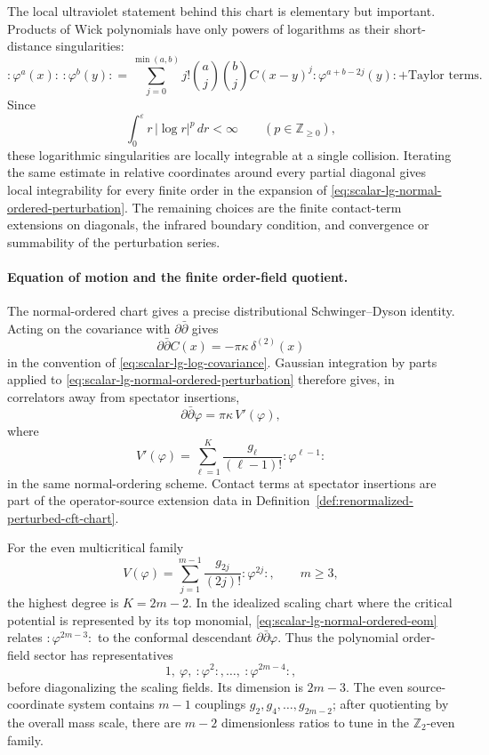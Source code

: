 The local ultraviolet statement behind this chart is elementary but
important.  Products of Wick polynomials have only powers of logarithms as
their short-distance singularities:
\[
  :\!\varphi^a(x)\!:\,:\!\varphi^b(y)\!:
  =
  \sum_{j=0}^{\min(a,b)}
  j!\binom{a}{j}\binom{b}{j}C(x-y)^j
  :\!\varphi^{a+b-2j}(y)\!:
  +\text{Taylor terms}.
\]
Since
\[
  \int_0^\varepsilon r\,|\log r|^p\,dr<\infty
  \qquad (p\in\mathbb Z_{\geq0}),
\]
these logarithmic singularities are locally integrable at a single collision.
Iterating the same estimate in relative coordinates around every partial
diagonal gives local integrability for every finite order in the expansion of
\eqref{eq:scalar-lg-normal-ordered-perturbation}.  The remaining choices are
the finite contact-term extensions on diagonals, the infrared boundary
condition, and convergence or summability of the perturbation series.

\paragraph{Equation of motion and the finite order-field quotient.}
The normal-ordered chart gives a precise distributional Schwinger--Dyson
identity.  Acting on the covariance with \(\partial\bar\partial\) gives
\[
  \partial\bar\partial C(x)=-\pi\kappa\,\delta^{(2)}(x)
\]
in the convention of \eqref{eq:scalar-lg-log-covariance}.  Gaussian
integration by parts applied to
\eqref{eq:scalar-lg-normal-ordered-perturbation} therefore gives, in
correlators away from spectator insertions,
\begin{equation}
  \partial\bar\partial\varphi
  =
  \pi\kappa\, V'(\varphi),
  \label{eq:scalar-lg-normal-ordered-eom}
\end{equation}
where
\[
  V'(\varphi)
  =
  \sum_{\ell=1}^{K}\frac{g_\ell}{(\ell-1)!}:\!\varphi^{\ell-1}\!:
\]
in the same normal-ordering scheme.  Contact terms at spectator insertions
are part of the operator-source extension data in
Definition~\ref{def:renormalized-perturbed-cft-chart}.

For the even multicritical family
\begin{equation}
  V(\varphi)=
  \sum_{j=1}^{m-1}\frac{g_{2j}}{(2j)!}:\!\varphi^{2j}\!:,
  \qquad m\geq3,
  \label{eq:even-polynomial-lg-family}
\end{equation}
the highest degree is \(K=2m-2\).  In the idealized scaling chart where the
critical potential is represented by its top monomial,
\eqref{eq:scalar-lg-normal-ordered-eom} relates
\(:\!\varphi^{2m-3}\!:\) to the conformal descendant
\(\partial\bar\partial\varphi\).  Thus the polynomial order-field sector
has representatives
\begin{equation}
  1,\ \varphi,\ :\!\varphi^2\!:,\ldots,\ :\!\varphi^{2m-4}\!: ,
  \label{eq:scalar-lg-order-field-basis}
\end{equation}
before diagonalizing the scaling fields.  Its dimension is \(2m-3\).
The even source-coordinate system contains \(m-1\) couplings \(g_2,g_4,\ldots,g_{2m-2}\);
after quotienting by the overall mass scale, there are \(m-2\)
dimensionless ratios to tune in the \(\mathbb Z_2\)-even family.

